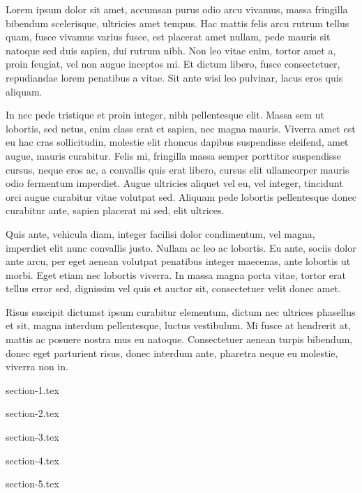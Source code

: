\documentclass{TMR}
\begin{document}
\begin{coverletter}

Lorem ipsum dolor sit amet, accumsan purus odio arcu vivamus, massa fringilla bibendum scelerisque, ultricies amet tempus. Hac mattis felis arcu rutrum tellus quam, fusce vivamus varius fusce, est placerat amet nullam, pede mauris sit natoque sed duis sapien, dui rutrum nibh. Non leo vitae enim, tortor amet a, proin feugiat, vel non augue inceptos mi. Et dictum libero, fusce consectetuer, repudiandae lorem penatibus a vitae. Sit ante wisi leo pulvinar, lacus eros quis aliquam. 

In nec pede tristique et proin integer, nibh pellentesque elit. Massa sem ut lobortis, sed netus, enim class erat et sapien, nec magna mauris. Viverra amet est eu hac cras sollicitudin, molestie elit rhoncus dapibus suspendisse eleifend, amet augue, mauris curabitur. Felis mi, fringilla massa semper porttitor suspendisse cursus, neque eros ac, a convallis quis erat libero, cursus elit ullamcorper mauris odio fermentum imperdiet. Augue ultricies aliquet vel eu, vel integer, tincidunt orci augue curabitur vitae volutpat sed. Aliquam pede lobortis pellentesque donec curabitur ante, sapien placerat mi sed, elit ultrices.

Quis ante, vehicula diam, integer facilisi dolor condimentum, vel magna, imperdiet elit nunc convallis justo. Nullam ac leo ac lobortis. Eu ante, sociis dolor ante arcu, per eget aenean volutpat penatibus integer maecenas, ante lobortis ut morbi. Eget etiam nec lobortis viverra. In massa magna porta vitae, tortor erat tellus error sed, dignissim vel quis et auctor sit, consectetuer velit donec amet. 

Risus suscipit dictumst ipsum curabitur elementum, dictum nec ultrices phasellus et sit, magna interdum pellentesque, luctus vestibulum. Mi fusce at hendrerit at, mattis ac posuere nostra mus eu natoque. Consectetuer aenean turpis bibendum, donec eget parturient risus, donec interdum ante, pharetra neque eu molestie, viverra non in.

\end{coverletter}


\begin{resume}

{section-1.tex}

{section-2.tex}

{section-3.tex}

{section-4.tex}

{section-5.tex}

\end{resume}
\end{document}

